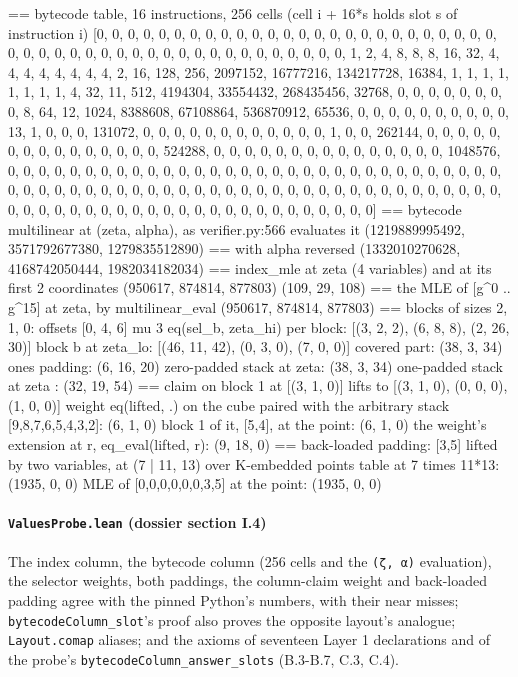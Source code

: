 \begin{srccode}
== bytecode table, 16 instructions, 256 cells (cell i + 16*s holds slot s of instruction i)
[0, 0, 0, 0, 0, 0, 0, 0, 0, 0, 0, 0, 0, 0, 0, 0, 0, 0, 0, 0, 0, 0, 0, 0, 0, 0, 0, 0, 0, 0, 0, 0, 0, 0, 0, 0, 0, 0, 0, 0, 0, 0, 0, 0, 0, 0, 0, 0, 1, 2, 4, 8, 8, 8, 16, 32, 4, 4, 4, 4, 4, 4, 4, 4, 2, 16, 128, 256, 2097152, 16777216, 134217728, 16384, 1, 1, 1, 1, 1, 1, 1, 1, 4, 32, 11, 512, 4194304, 33554432, 268435456, 32768, 0, 0, 0, 0, 0, 0, 0, 0, 8, 64, 12, 1024, 8388608, 67108864, 536870912, 65536, 0, 0, 0, 0, 0, 0, 0, 0, 0, 0, 13, 1, 0, 0, 0, 131072, 0, 0, 0, 0, 0, 0, 0, 0, 0, 0, 0, 0, 1, 0, 0, 262144, 0, 0, 0, 0, 0, 0, 0, 0, 0, 0, 0, 0, 0, 0, 0, 524288, 0, 0, 0, 0, 0, 0, 0, 0, 0, 0, 0, 0, 0, 0, 0, 1048576, 0, 0, 0, 0, 0, 0, 0, 0, 0, 0, 0, 0, 0, 0, 0, 0, 0, 0, 0, 0, 0, 0, 0, 0, 0, 0, 0, 0, 0, 0, 0, 0, 0, 0, 0, 0, 0, 0, 0, 0, 0, 0, 0, 0, 0, 0, 0, 0, 0, 0, 0, 0, 0, 0, 0, 0, 0, 0, 0, 0, 0, 0, 0, 0, 0, 0, 0, 0, 0, 0, 0, 0, 0, 0, 0, 0, 0, 0, 0, 0, 0, 0, 0, 0, 0, 0, 0, 0]
== bytecode multilinear at (zeta, alpha), as verifier.py:566 evaluates it
(1219889995492, 3571792677380, 1279835512890)
== with alpha reversed
(1332010270628, 4168742050444, 1982034182034)
== index_mle at zeta (4 variables) and at its first 2 coordinates
(950617, 874814, 877803) (109, 29, 108)
== the MLE of [g^0 .. g^15] at zeta, by multilinear_eval
(950617, 874814, 877803)
== blocks of sizes 2, 1, 0: offsets [0, 4, 6] mu 3
eq(sel_b, zeta_hi) per block: [(3, 2, 2), (6, 8, 8), (2, 26, 30)]
block b at zeta_lo: [(46, 11, 42), (0, 3, 0), (7, 0, 0)]
covered part: (38, 3, 34)  ones padding: (6, 16, 20)
zero-padded stack at zeta: (38, 3, 34)
one-padded stack at zeta : (32, 19, 54)
== claim on block 1 at [(3, 1, 0)] lifts to [(3, 1, 0), (0, 0, 0), (1, 0, 0)]
weight eq(lifted, .) on the cube paired with the arbitrary stack [9,8,7,6,5,4,3,2]:
(6, 1, 0)   block 1 of it, [5,4], at the point: (6, 1, 0)
the weight's extension at r, eq_eval(lifted, r): (9, 18, 0)
== back-loaded padding: [3,5] lifted by two variables, at (7 | 11, 13) over K-embedded points
table at 7 times 11*13: (1935, 0, 0)
MLE of [0,0,0,0,0,0,3,5] at the point: (1935, 0, 0)
\end{srccode}

\paragraph{\texttt{ValuesProbe.\allowbreak{}lean} (dossier section I.4)}\label{sec:gen-layer1-I4}

The index column, the bytecode column (256 cells and the \texttt{(\allowbreak{}ζ,\allowbreak{} α)} evaluation), the selector weights, both paddings, the column-claim weight and back-loaded padding agree with the pinned Python's numbers, with their near misses; \texttt{bytecodeColumn\_\allowbreak{}slot}'s proof also proves the opposite layout's analogue; \texttt{Layout.\allowbreak{}comap} aliases; and the axioms of seventeen Layer 1 declarations and of the probe's \texttt{bytecodeColumn\_\allowbreak{}answer\_\allowbreak{}slots} (B.3-B.7, C.3, C.4).

